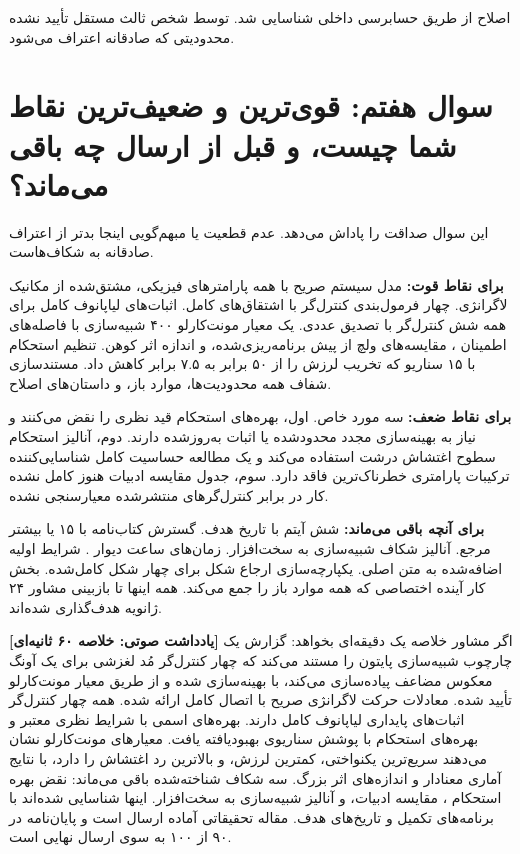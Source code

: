 \documentclass[12pt, a4paper]{article}
\newcommand{\dash}{\lr{---}}
\begin{document}
اصلاح از طريق حسابرسی داخلی شناسايی شد. توسط شخص ثالث مستقل تأييد نشده \dash{} محدوديتی که صادقانه اعتراف می‌شود.

\section{سوال هفتم: قوی‌ترين و ضعيف‌ترين نقاط شما چيست، و قبل از ارسال چه باقی می‌ماند؟}

اين سوال صداقت را پاداش می‌دهد. عدم قطعيت يا مبهم‌گويی اينجا بدتر از اعتراف صادقانه به شکاف‌هاست.

\textbf{برای نقاط قوت:} مدل سيستم صريح با همه پارامترهای فيزيکی، مشتق‌شده از مکانيک لاگرانژی. چهار فرمول‌بندی کنترل‌گر با اشتقاق‌های کامل. اثبات‌های لياپانوف کامل برای همه شش کنترل‌گر با تصديق عددی. يک معيار مونت‌کارلو ۴۰۰ شبيه‌سازی با فاصله‌های اطمينان ، مقايسه‌های ولچ از پيش برنامه‌ريزی‌شده، و اندازه اثر  کوهن. تنظيم  استحکام با ۱۵ سناريو که تخريب لرزش را از ۵۰ برابر به ۷.۵ برابر کاهش داد. مستندسازی شفاف همه محدوديت‌ها، موارد باز، و داستان‌های اصلاح.

\textbf{برای نقاط ضعف:} سه مورد خاص. اول، بهره‌های استحکام  قيد نظری را نقض می‌کنند و نياز به بهينه‌سازی مجدد محدودشده يا اثبات به‌روزشده دارند. دوم، آناليز استحکام سطوح اغتشاش درشت استفاده می‌کند و يک مطالعه حساسيت کامل شناسايی‌کننده ترکيبات پارامتری خطرناک‌ترين فاقد دارد. سوم، جدول مقايسه ادبيات هنوز کامل نشده \dash{} کار در برابر کنترل‌گرهای  منتشرشده معيارسنجی نشده.

\textbf{برای آنچه باقی می‌ماند:} شش آيتم با تاريخ هدف. گسترش کتاب‌نامه با ۱۵ يا بيشتر مرجع. آناليز شکاف شبيه‌سازی به سخت‌افزار. زمان‌های ساعت ديوار . شرايط اوليه  اضافه‌شده به متن اصلی. يکپارچه‌سازی ارجاع شکل برای چهار شکل کامل‌شده. بخش کار آينده اختصاصی که همه موارد باز را جمع می‌کند. همه اينها تا بازبينی مشاور ۲۴ ژانويه هدف‌گذاری شده‌اند.


\begin{mdframed}[
  backgroundcolor=audiotan,
  linecolor=audionote!70,
  linewidth=1pt,
  innerleftmargin=12pt,
  innerrightmargin=12pt,
  innertopmargin=8pt,
  innerbottommargin=8pt
]
\textbf{\color{audionote}[يادداشت صوتی: خلاصه ۶۰ ثانيه‌ای]}
اگر مشاور خلاصه يک دقيقه‌ای بخواهد: گزارش يک چارچوب شبيه‌سازی پايتون را مستند می‌کند که چهار کنترل‌گر مُد لغزشی برای يک آونگ معکوس مضاعف پياده‌سازی می‌کند، با  بهينه‌سازی شده و از طريق معيار مونت‌کارلو تأييد شده. معادلات حرکت لاگرانژی صريح با اتصال کامل ارائه شده. همه چهار کنترل‌گر اثبات‌های پايداری لياپانوف کامل دارند.  بهره‌های اسمی با شرايط نظری معتبر و بهره‌های استحکام با پوشش سناريوی بهبودیافته يافت. معيارهای مونت‌کارلو نشان می‌دهند  سريع‌ترين يکنواختی، کمترين لرزش، و بالاترين رد اغتشاش را دارد، با نتايج آماری معنادار و اندازه‌های اثر بزرگ. سه شکاف شناخته‌شده باقی می‌ماند: نقض بهره استحکام ، مقايسه ادبيات، و آناليز شبيه‌سازی به سخت‌افزار. اينها شناسايی شده‌اند با برنامه‌های تکميل و تاريخ‌های هدف. مقاله تحقيقاتی آماده ارسال است و پايان‌نامه در ۹۰ از ۱۰۰ به سوی ارسال نهايی است.
\end{mdframed}
\end{document}
